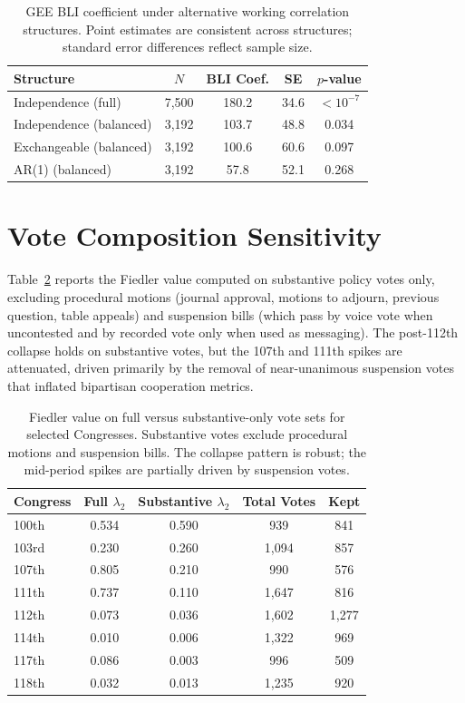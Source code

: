 \documentclass[12pt, a4paper]{article}
\begin{document}
\begin{table}[H]
\centering
{\small
\caption{GEE BLI coefficient under alternative working correlation structures. Point estimates are consistent across structures; standard error differences reflect sample size.}
\label{tab:gee_sensitivity}
\begin{tabular}{lcccc}
\toprule
Structure & $N$ & BLI Coef. & SE & $p$-value \\
\midrule
Independence (full) & 7,500 & 180.2 & 34.6 & $< 10^{-7}$ \\
Independence (balanced) & 3,192 & 103.7 & 48.8 & 0.034 \\
Exchangeable (balanced) & 3,192 & 100.6 & 60.6 & 0.097 \\
AR(1) (balanced) & 3,192 & 57.8 & 52.1 & 0.268 \\
\bottomrule
\end{tabular}
}
\end{table}

\section{Vote Composition Sensitivity}
\label{app:vote_filter}

Table~\ref{tab:vote_filter} reports the Fiedler value computed on substantive policy votes only, excluding procedural motions (journal approval, motions to adjourn, previous question, table appeals) and suspension bills (which pass by voice vote when uncontested and by recorded vote only when used as messaging). The post-112th collapse holds on substantive votes, but the 107th and 111th spikes are attenuated, driven primarily by the removal of near-unanimous suspension votes that inflated bipartisan cooperation metrics.

\begin{table}[H]
\centering
{\small
\caption{Fiedler value on full versus substantive-only vote sets for selected Congresses. Substantive votes exclude procedural motions and suspension bills. The collapse pattern is robust; the mid-period spikes are partially driven by suspension votes.}
\label{tab:vote_filter}
\begin{tabular}{lcccc}
\toprule
Congress & Full $\lambda_2$ & Substantive $\lambda_2$ & Total Votes & Kept \\
\midrule
100th & 0.534 & 0.590 & 939 & 841 \\
103rd & 0.230 & 0.260 & 1,094 & 857 \\
107th & 0.805 & 0.210 & 990 & 576 \\
111th & 0.737 & 0.110 & 1,647 & 816 \\
112th & 0.073 & 0.036 & 1,602 & 1,277 \\
114th & 0.010 & 0.006 & 1,322 & 969 \\
117th & 0.086 & 0.003 & 996 & 509 \\
118th & 0.032 & 0.013 & 1,235 & 920 \\
\bottomrule
\end{tabular}
}
\end{table}
\end{document}
